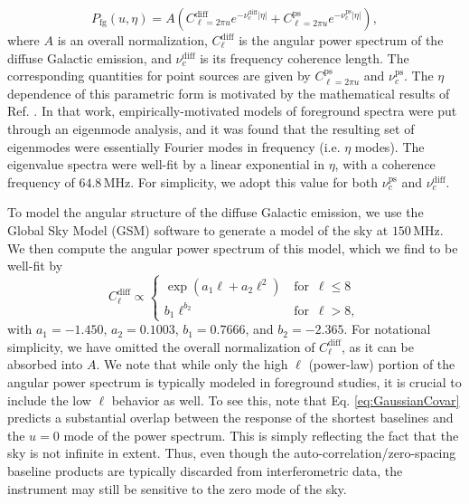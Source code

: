 \documentclass[twocolumn,aps,prd,nofootinbib,showpacs]{revtex4-1}
\begin{document}
\begin{equation}
P_\textrm{fg} (u, \eta) = A \left( C_{\ell = 2 \pi u}^\textrm{diff} e^{- \nu_c^\textrm{diff} |\eta|} + C_{\ell = 2 \pi u}^\textrm{ps} e^{- \nu_c^\textrm{ps} |\eta|} \right),
\end{equation}
where $A$ is an overall normalization, $C_\ell^\textrm{diff}$ is the angular power spectrum of the diffuse Galactic emission, and $\nu_c^\textrm{diff}$ is its frequency coherence length.  The corresponding quantities for point sources are given by $C_{\ell = 2 \pi u}^\textrm{ps}$ and $ \nu_c^\textrm{ps}$.  The $\eta$ dependence of this parametric form is motivated by the mathematical results of Ref. \cite{Liu2012}.  In that work, empirically-motivated models of foreground spectra were put through an eigenmode analysis, and it was found that the resulting set of eigenmodes were essentially Fourier modes in frequency (i.e. $\eta$ modes).  The eigenvalue spectra were well-fit by a linear exponential in $\eta$, with a coherence frequency of $64.8\,\textrm{MHz}$.  For simplicity, we adopt this value for both  $ \nu_c^\textrm{ps}$ and  $ \nu_c^\textrm{diff}$.

To model the angular structure of the diffuse Galactic emission, we use the Global Sky Model (GSM) software \cite{deOliveiraCosta2008} to generate a model of the sky at $150\,\textrm{MHz}$.  We then compute the angular power spectrum of this model, which we find to be well-fit by
\begin{equation}
C_\ell^\textrm{diff} \propto
\begin{cases}
\exp \left( a_1 \ell + a_2 \ell^2\right) &\, \textrm{for } \, \ell \le 8 \\
b_1 \ell^{b_2} &\, \textrm{for }\,\ell > 8,
\end{cases}
\end{equation}
with $a_1 = -1.450$, $a_2 = 0.1003$, $b_1 = 0.7666$, and $b_2 = -2.365$.  For notational simplicity, we have omitted the overall normalization of $C_\ell^\textrm{diff}$, as it can be absorbed into $A$.  We note that while only the high $\ell$ (power-law) portion of the angular power spectrum is typically modeled in foreground studies, it is crucial to include the low $\ell$ behavior as well.  To see this, note that  Eq. \eqref{eq:GaussianCovar} predicts a substantial overlap between the response of the shortest baselines and the $u=0$ mode of the power spectrum. This is simply reflecting the fact that the sky is not infinite in extent.  Thus, even though the auto-correlation/zero-spacing baseline products are typically discarded from interferometric data, the instrument may still be sensitive to the zero mode of the sky.
\end{document}
